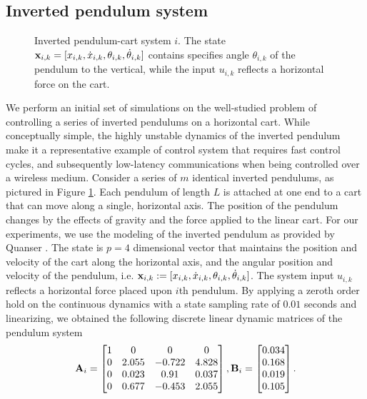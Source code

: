 \subsection{Inverted pendulum system}

\begin{figure}

\caption{Inverted pendulum-cart system $i$. The state ${\mathbf x}_{i,k} = [x_{i,k}, \dot{x}_{i,k}, \theta_{i,k}, \dot{\theta}_{i,k}]$ contains specifies angle $ \theta_{i,k}$ of the pendulum to the vertical, while the input $u_{i,k}$ reflects a horizontal force on the cart.}
\label{fig_inverted_pendulum}
\end{figure}


We perform an initial set of simulations on the well-studied problem of controlling a series of inverted pendulums on a horizontal cart. While conceptually simple, the highly unstable dynamics of the inverted pendulum make it a representative example of control system that requires fast control cycles, and subsequently low-latency communications when being controlled over a wireless medium. Consider a series of $m$ identical inverted pendulums, as pictured in Figure \ref{fig_inverted_pendulum}. Each pendulum of length $L$ is attached at one end to a cart that can move along a single, horizontal axis. The position of the pendulum changes by the effects of gravity and the force applied to the linear cart. For our experiments, we use the modeling of the inverted pendulum as provided by Quanser \cite{quanser}. The state is $p=4$ dimensional vector that maintains the position and velocity of the cart along the horizontal axis, and the angular position and velocity of the pendulum, i.e. ${\mathbf x}_{i,k} := [x_{i,k}, \dot{x}_{i,k}, \theta_{i,k}, \dot{\theta}_{i,k}]$. The system input $u_{i,k}$ reflects a horizontal force placed upon $i$th pendulum. By applying a zeroth order hold on the continuous dynamics with a state sampling rate of $0.01$ seconds and linearizing, we obtained the following discrete linear dynamic matrices of the pendulum system
%
\begin{align}\label{eq_control_orig}
\bbA_i =
\begin{bmatrix}
1 & 0 & 0 & 0 \\
0 & 2.055 & -0.722 & 4.828 \\
0 & 0.023 & 0.91 & 0.037 \\
0 & 0.677 & -0.453 & 2.055
\end{bmatrix},
\bbB_i =
\begin{bmatrix}
0.034 \\ 0.168 \\ 0.019 \\ 0.105
\end{bmatrix}.
\end{align}
%

